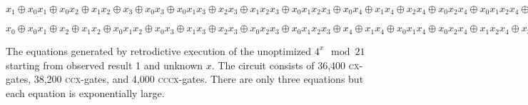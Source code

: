 \documentclass[sigplan]{acmart}
\newcommand{\cx}{\textsc{cx}}
\newcommand{\ccx}{\textsc{ccx}}
\newcommand{\cccx}{\textsc{cccx}}
\begin{document}
\bigskip

$x_1 \oplus x_0x_1 \oplus x_0x_2 \oplus x_1x_2 \oplus x_3 \oplus
x_0x_3 \oplus x_0x_1x_3 \oplus x_2x_3 \oplus x_1x_2x_3 \oplus
x_0x_1x_2x_3 \oplus x_0x_4 \oplus x_1x_4 \oplus x_2x_4 \oplus
x_0x_2x_4 \oplus x_0x_1x_2x_4 \oplus x_3x_4 \oplus x_1x_3x_4 \oplus
x_0x_1x_3x_4 \oplus x_0x_2x_3x_4 \oplus x_1x_2x_3x_4 \oplus x_5 \oplus
x_0x_5 \oplus x_0x_1x_5 \oplus x_2x_5 \oplus x_1x_2x_5 \oplus
x_0x_1x_2x_5 \oplus x_0x_3x_5 \oplus x_1x_3x_5 \oplus x_2x_3x_5 \oplus
x_0x_2x_3x_5 \oplus x_0x_1x_2x_3x_5 \oplus x_4x_5 \oplus x_1x_4x_5
\oplus x_0x_1x_4x_5 \oplus x_0x_2x_4x_5 \oplus x_1x_2x_4x_5 \oplus
x_3x_4x_5 \oplus x_0x_3x_4x_5 \oplus x_0x_1x_3x_4x_5 \oplus
x_2x_3x_4x_5 \oplus x_1x_2x_3x_4x_5 \oplus x_0x_1x_2x_3x_4x_5 = 0$

\bigskip

$x_0 \oplus x_0x_1 \oplus x_2 \oplus x_1x_2 \oplus x_0x_1x_2 \oplus
x_0x_3 \oplus x_1x_3 \oplus x_2x_3 \oplus x_0x_2x_3 \oplus
x_0x_1x_2x_3 \oplus x_4 \oplus x_1x_4 \oplus x_0x_1x_4 \oplus
x_0x_2x_4 \oplus x_1x_2x_4 \oplus x_3x_4 \oplus x_0x_3x_4 \oplus
x_0x_1x_3x_4 \oplus x_2x_3x_4 \oplus x_1x_2x_3x_4 \oplus
x_0x_1x_2x_3x_4 \oplus x_0x_5 \oplus x_1x_5 \oplus x_2x_5 \oplus
x_0x_2x_5 \oplus x_0x_1x_2x_5 \oplus x_3x_5 \oplus x_1x_3x_5 \oplus
x_0x_1x_3x_5 \oplus x_0x_2x_3x_5 \oplus x_1x_2x_3x_5 \oplus x_4x_5
\oplus x_0x_4x_5 \oplus x_0x_1x_4x_5 \oplus x_2x_4x_5 \oplus
x_1x_2x_4x_5 \oplus x_0x_1x_2x_4x_5 \oplus x_0x_3x_4x_5 \oplus
x_1x_3x_4x_5 \oplus x_2x_3x_4x_5 \oplus x_0x_2x_3x_4x_5 \oplus
x_0x_1x_2x_3x_4x_5 = 0$

\bigskip

The equations generated by retrodictive execution of the unoptimized
$4^x \mod{21}$ starting from observed result 1 and unknown $x$. The
circuit consists of 36,400 \cx-gates, 38,200 \ccx-gates, and 4,000
\cccx-gates. There are only three equations but each equation is
exponentially large.



\end{document}
